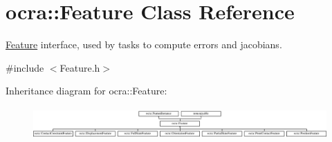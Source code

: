 \hypertarget{classocra_1_1Feature}{}\section{ocra\+:\+:Feature Class Reference}
\label{classocra_1_1Feature}


\hyperlink{classocra_1_1Feature}{Feature} interface, used by tasks to compute errors and jacobians.  




{\ttfamily \#include $<$Feature.\+h$>$}

Inheritance diagram for ocra\+:\+:Feature\+:\begin{figure}[H]
\begin{center}
\leavevmode
\includegraphics[height=1.224490cm]{d6/d87/classocra_1_1Feature}
\end{center}
\end{figure}

